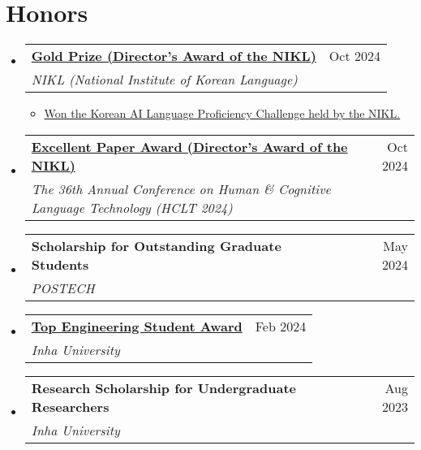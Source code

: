 \documentclass[letterpaper,11pt]{article}
\makeatletter
\newcommand{\resumeSubheading}[4]{
  \vspace{-1pt}\item
    \begin{tabular*}{0.97\textwidth}{l@{\extracolsep{\fill}}r}
      #1 & #2 \\
      \textit{\small#3} & \textit{\small #4} \\
    \end{tabular*}\vspace{-5pt}
}
\makeatother
\begin{document}
    \section{Honors}
    \begin{itemize}[leftmargin=*,label=]

        \resumeSubheading
        {\textbf{\href{https://n.news.naver.com/article/016/0002373400?sid=105}{Gold Prize (Director's Award of the NIKL)}}}{Oct 2024}
            {NIKL (National Institute of Korean Language)}{}
            \begin{itemize}[label=\bullet]
                \item{\href{https://kli.korean.go.kr/benchmark/taskBoardsOrdtm/boardsOrdtm/noticeView.do?page=0&recordId=275&boardOrdtmId=}{Won the Korean AI Language Proficiency Challenge held by the NIKL.}}
            \end{itemize}
            
        \resumeSubheading
        {\textbf{\href{https://kli.korean.go.kr/benchmark/taskBoardsOrdtm/boardsOrdtm/noticeView.do?page=0\&recordId=269\&boardOrdtmId}{Excellent Paper Award (Director's Award of the NIKL)}}}{Oct 2024}
            {The 36th Annual Conference on Human \& Cognitive Language Technology (HCLT 2024)}{}
            
        \resumeSubheading
        {\textbf{Scholarship for Outstanding Graduate Students}}{May 2024}
            {POSTECH}{}
            
        \resumeSubheading
        {\textbf{\href{https://engcollege.inha.ac.kr/engineering/9743/subview.do?enc=Zm5jdDF8QEB8JTJGYmJzJTJGZW5naW5lZXJpbmclMkYyNDYyJTJGMTIyNzQyJTJGYXJ0Y2xWaWV3LmRvJTNGcGFnZSUzRDElMjZzcmNoQ29sdW1uJTNEc2olMjZzcmNoV3JkJTNEJUVDJThCJTlDJUVDJTgzJTgxJUVDJThCJTlEJTI2YmJzQ2xTZXElM0QlMjZiYnNPcGVuV3JkU2VxJTNEJTI2cmdzQmduZGVTdHIlM0QlMjZyZ3NFbmRkZVN0ciUzRCUyNmlzVmlld01pbmUlM0RmYWxzZSUyNnBhc3N3b3JkJTNEJTI2}{Top Engineering Student Award}}}{Feb 2024}
            {Inha University}{}

        \resumeSubheading
        {\textbf{Research Scholarship for Undergraduate Researchers}}{Aug 2023}
            {Inha University}{}
            
    \end{itemize}
\end{document}
